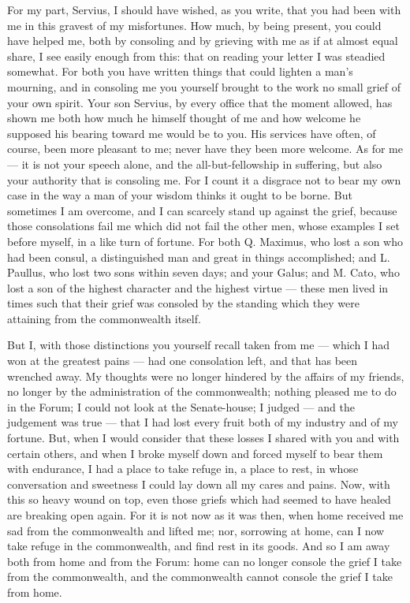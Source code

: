 

 For my part, Servius, I should have wished, as you write, that you had been with me in this gravest of my misfortunes. How much, by being present, you could have helped me, both by consoling and by grieving with me as if at almost equal share, I see easily enough from this: that on reading your letter I was steadied somewhat. For both you have written things that could lighten a man's mourning, and in consoling me you yourself brought to the work no small grief of your own spirit. Your son Servius, by every office that the moment allowed, has shown me both how much he himself thought of me and how welcome he supposed his bearing toward me would be to you. His services have often, of course, been more pleasant to me; never have they been more welcome. As for me --- it is not your speech alone, and the all-but-fellowship in suffering, but also your authority that is consoling me. For I count it a disgrace not to bear my own case in the way a man of your wisdom thinks it ought to be borne. But sometimes I am overcome, and I can scarcely stand up against the grief, because those consolations fail me which did not fail the other men, whose examples I set before myself, in a like turn of fortune. For both Q. Maximus, who lost a son who had been consul, a distinguished man and great in things accomplished; and L. Paullus, who lost two sons within seven days; and your Galus; and M. Cato, who lost a son of the highest character and the highest virtue --- these men lived in times such that their grief was consoled by the standing which they were attaining from the commonwealth itself.

 But I, with those distinctions you yourself recall taken from me --- which I had won at the greatest pains --- had one consolation left, and that has been wrenched away. My thoughts were no longer hindered by the affairs of my friends, no longer by the administration of the commonwealth; nothing pleased me to do in the Forum; I could not look at the Senate-house; I judged --- and the judgement was true --- that I had lost every fruit both of my industry and of my fortune. But, when I would consider that these losses I shared with you and with certain others, and when I broke myself down and forced myself to bear them with endurance, I had a place to take refuge in, a place to rest, in whose conversation and sweetness I could lay down all my cares and pains. Now, with this so heavy wound on top, even those griefs which had seemed to have healed are breaking open again. For it is not now as it was then, when home received me sad from the commonwealth and lifted me; nor, sorrowing at home, can I now take refuge in the commonwealth, and find rest in its goods. And so I am away both from home and from the Forum: home can no longer console the grief I take from the commonwealth, and the commonwealth cannot console the grief I take from home.

